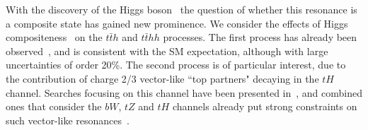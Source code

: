 \label{sec9:MCHMtthh}
With the discovery of the Higgs boson~\cite{Aad:2012tfa,
CMSHiggsJuly2012} the question of whether this resonance is a
composite state has gained new prominence.  We consider the effects of
Higgs compositeness~\cite{Kaplan:1983fs, Kaplan:1983sm, Georgi:1984ef, Georgi:1984af, Dugan:1984hq} on the $t\bar{t}h$ and
$t\bar{t}  h h$ processes.  The first process has already been
observed~\cite{Aaboud:2018urx, Sirunyan:2018hoz}, and is consistent
with the SM expectation, although with large uncertainties of order
20\%.  The second process is of particular interest, due to the contribution of charge 2/3 vector-like ``top partners" decaying in the $tH$ channel. Searches focusing on
this channel have been presented in~\cite{Aaboud:2018xuw}, and
combined ones that consider the $bW$, $tZ$ and $tH$ channels
already put strong constraints on such vector-like
resonances~\cite{Aaboud:2018pii, Sirunyan:2018omb}.

